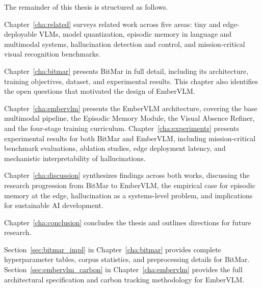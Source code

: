 The remainder of this thesis is structured as follows.

Chapter~\ref{cha:related} surveys related work across five areas: tiny and edge-deployable VLMs, model quantization, episodic memory in language and multimodal systems, hallucination detection and control, and mission-critical visual recognition benchmarks.

Chapter~\ref{cha:bitmar} presents BitMar in full detail, including its architecture, training objectives, dataset, and experimental results. This chapter also identifies the open questions that motivated the design of EmberVLM.

Chapter~\ref{cha:embervlm} presents the EmberVLM architecture, covering the base multimodal pipeline, the Episodic Memory Module, the Visual Absence Refiner, and the four-stage training curriculum. Chapter~\ref{cha:experiments} presents experimental results for both BitMar and EmberVLM, including mission-critical benchmark evaluations, ablation studies, edge deployment latency, and mechanistic interpretability of hallucinations.

Chapter~\ref{cha:discussion} synthesizes findings across both works, discussing the research progression from BitMar to EmberVLM, the empirical case for episodic memory at the edge, hallucination as a systems-level problem, and implications for sustainable AI development.

Chapter~\ref{cha:conclusion} concludes the thesis and outlines directions for future research.

Section~\ref{sec:bitmar_impl} in Chapter~\ref{cha:bitmar} provides complete hyperparameter tables, corpus statistics, and preprocessing details for BitMar. Section~\ref{sec:embervlm_carbon} in Chapter~\ref{cha:embervlm} provides the full architectural specification and carbon tracking methodology for EmberVLM.
